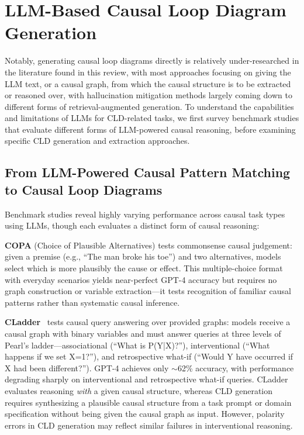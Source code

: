 
\section{LLM-Based Causal Loop Diagram Generation}
\label{sec:lit_cld_generation}

Notably, generating causal loop diagrams directly is relatively under-researched in the literature found in this review, with most approaches focusing on giving the LLM text, or a causal graph, from which the causal structure is to be extracted or reasoned over, with hallucination mitigation methods largely coming down to different forms of retrieval-augmented generation. To understand the capabilities and limitations of LLMs for CLD-related tasks, we first survey benchmark studies that evaluate different forms of LLM-powered causal reasoning, before examining specific CLD generation and extraction approaches.

\subsection{From LLM-Powered Causal Pattern Matching to Causal Loop Diagrams}

Benchmark studies reveal highly varying performance across causal task types using LLMs, though each evaluates a distinct form of causal reasoning:

\textbf{COPA} (Choice of Plausible Alternatives) tests commonsense causal judgement: given a premise (e.g., ``The man broke his toe'') and two alternatives, models select which is more plausibly the cause or effect. This multiple-choice format with everyday scenarios yields near-perfect GPT-4 accuracy but requires no graph construction or variable extraction---it tests recognition of familiar causal patterns rather than systematic causal inference.

\textbf{CLadder}~\citep{jin2023cladder} tests causal query answering over provided graphs: models receive a causal graph with binary variables and must answer queries at three levels of Pearl's ladder---associational (``What is P(Y|X)?''), interventional (``What happens if we set X=1?''), and retrospective what-if (``Would Y have occurred if X had been different?''). GPT-4 achieves only $\sim$62\% accuracy, with performance degrading sharply on interventional and retrospective what-if queries. CLadder evaluates reasoning \textit{with} a given causal structure, whereas CLD generation requires synthesizing a plausible causal structure from a task prompt or domain specification without being given the causal graph as input. However, polarity errors in CLD generation may reflect similar failures in interventional reasoning.

